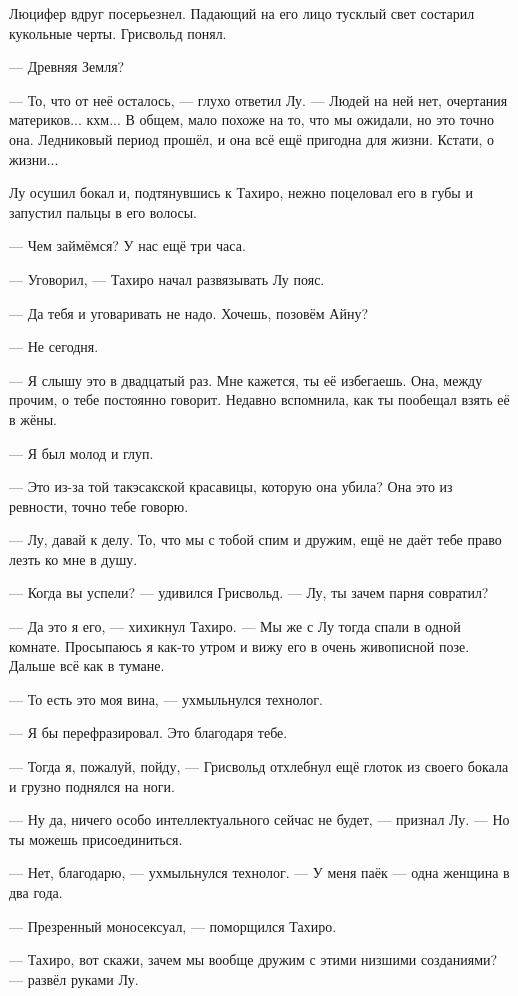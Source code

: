 Люцифер вдруг посерьезнел.
Падающий на его лицо тусклый свет состарил кукольные черты.
Грисвольд понял.

--- Древняя Земля?

--- То, что от неё осталось, --- глухо ответил Лу.
--- Людей на ней нет, очертания материков... кхм...
В общем, мало похоже на то, что мы ожидали, но это точно она.
Ледниковый период прошёл, и она всё ещё пригодна для жизни.
Кстати, о жизни...

Лу осушил бокал и, подтянувшись к Тахиро, нежно поцеловал его в губы и запустил пальцы в его волосы.

--- Чем займёмся?
У нас ещё три часа.

--- Уговорил, --- Тахиро начал развязывать Лу пояс.

--- Да тебя и уговаривать не надо.
Хочешь, позовём Айну?

--- Не сегодня.

--- Я слышу это в двадцатый раз.
Мне кажется, ты её избегаешь.
Она, между прочим, о тебе постоянно говорит.
Недавно вспомнила, как ты пообещал взять её в жёны.

--- Я был молод и глуп.

--- Это из-за той такэсакской красавицы, которую она убила?
Она это из ревности, точно тебе говорю.

--- Лу, давай к делу.
То, что мы с тобой спим и дружим, ещё не даёт тебе право лезть ко мне в душу.

--- Когда вы успели? --- удивился Грисвольд.
--- Лу, ты зачем парня совратил?

--- Да это я его, --- хихикнул Тахиро.
--- Мы же с Лу тогда спали в одной комнате.
Просыпаюсь я как-то утром и вижу его в очень живописной позе.
Дальше всё как в тумане.

--- То есть это моя вина, --- ухмыльнулся технолог.

--- Я бы перефразировал.
Это благодаря тебе.

--- Тогда я, пожалуй, пойду, --- Грисвольд отхлебнул ещё глоток из своего бокала и грузно поднялся на ноги.

--- Ну да, ничего особо интеллектуального сейчас не будет, --- признал Лу.
--- Но ты можешь присоединиться.

--- Нет, благодарю, --- ухмыльнулся технолог.
--- У меня паёк --- одна женщина в два года.

--- Презренный моносексуал, --- поморщился Тахиро.

--- Тахиро, вот скажи, зачем мы вообще дружим с этими низшими созданиями? --- развёл руками Лу.

